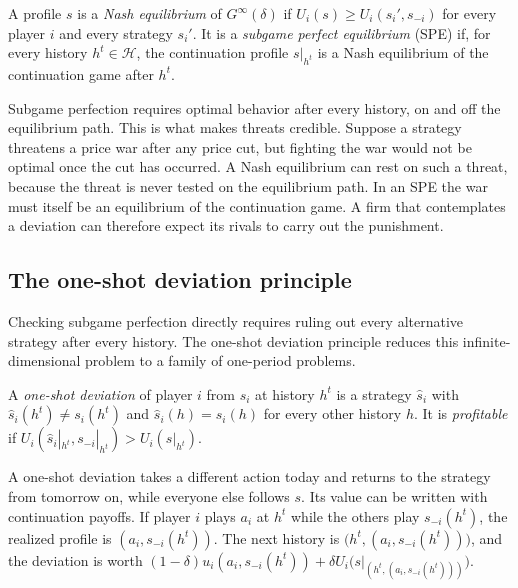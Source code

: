 \begin{definition}\label{def:12-spe}
A profile $s$ is a \emph{Nash equilibrium} of $G^\infty(\delta)$ if $U_i(s) \ge U_i(s_i', s_{-i})$ for every player
$i$ and every strategy $s_i'$. It is a \emph{subgame perfect equilibrium} (SPE) if, for every history
$h^t \in \mathcal H$, the continuation profile $s|_{h^t}$ is a Nash equilibrium of the continuation game after $h^t$.
\end{definition}

Subgame perfection requires optimal behavior after every history, on and off the equilibrium path. This is what
makes threats credible. Suppose a strategy threatens a price war after any price cut, but fighting the war would not
be optimal once the cut has occurred. A Nash equilibrium can rest on such a threat, because the threat is never
tested on the equilibrium path. In an SPE the war must itself be an equilibrium of the continuation game. A firm
that contemplates a deviation can therefore expect its rivals to carry out the punishment.

\subsection{The one-shot deviation principle}\label{sec:12-osdp}

Checking subgame perfection directly requires ruling out every alternative strategy after every history. The
one-shot deviation principle reduces this infinite-dimensional problem to a family of one-period problems.

\begin{definition}\label{def:12-one-shot}
A \emph{one-shot deviation} of player $i$ from $s_i$ at history $h^t$ is a strategy $\hat s_i$ with
$\hat s_i(h^t) \ne s_i(h^t)$ and $\hat s_i(h) = s_i(h)$ for every other history $h$. It is \emph{profitable} if
$U_i(\hat s_i|_{h^t}, s_{-i}|_{h^t}) > U_i(s|_{h^t})$.
\end{definition}

A one-shot deviation takes a different action today and returns to the strategy from tomorrow on, while everyone
else follows $s$. Its value can be written with continuation payoffs. If player $i$ plays $a_i$ at $h^t$ while the
others play $s_{-i}(h^t)$, the realized profile is $(a_i, s_{-i}(h^t))$. The next history is
$\bigl(h^t, (a_i, s_{-i}(h^t))\bigr)$, and the deviation is worth
$(1 - \delta)u_i(a_i, s_{-i}(h^t)) + \delta U_i\bigl(s|_{(h^t, (a_i, s_{-i}(h^t)))}\bigr)$.


